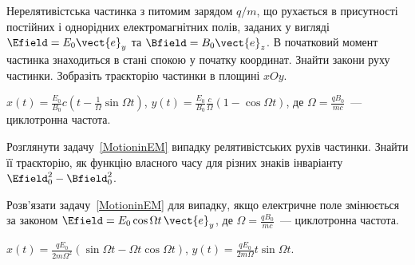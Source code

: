 \begin{problem}\label{MotioninEM}
Нерелятивістська частинка з питомим зарядом $q/m$, що рухається в присутності постійних і однорідних електромагнітних полів, заданих у вигляді $\Efield = E_0\vect{e}_y$ та $\Bfield = B_0\vect{e}_z$. В початковий момент частинка знаходиться в стані спокою у початку координат. Знайти закони руху частинки. Зобразіть траєкторію частинки в площині $xOy$.
\begin{solution}
	$x(t)  = \frac{E_0}{B_0}c\left( t - \frac{1}{\Omega}\sin\Omega t \right) $,
	$y(t)  = \frac{E_0}{B_0} \frac{c}{\Omega}\left( 1 - \cos\Omega t \right) $, де $\Omega = \frac{qB_0}{mc}$~--- циклотронна частота.
\end{solution}
\end{problem}

\begin{problem}
Розглянути задачу~\ref{MotioninEM} випадку релятивістських рухів частинки. Знайти її траєкторію, як функцію власного часу для різних знаків інваріанту $\Efield_0^2-\Bfield_0^2$.
\end{problem}


\begin{problem}
Розв'язати задачу~\ref{MotioninEM} для випадку, якщо електричне поле змінюється за законом $\Efield = E_0\cos\Omega t\,\vect{e}_y$,  де $\Omega = \frac{qB_0}{mc}$~--- циклотронна частота.
\begin{solution}
	$x(t)  = \frac{qE_0}{2m\Omega^2}\left( \sin\Omega t - \Omega t\cos\Omega t \right) $,
	$y(t)  = \frac{qE_0}{2m\Omega}t\sin\Omega t$.
\end{solution}
\end{problem}



